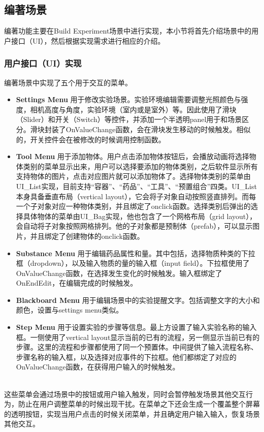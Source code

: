 \subsection{编著场景}
编著功能主要在Build Experiment场景中进行实现，本小节将首先介绍场景中的用户接口（UI），然后根据实现需求进行相应的介绍。

\subsubsection{用户接口（UI）实现}
编著场景中实现了五个用于交互的菜单。

\begin{itemize}
    \item \textbf{Settings Menu}
用于修改实验场景。实验环境编辑需要调整光照颜色与强度，相机高度与角度，实验环境（室内或是室外）等。因此使用了滑块（Slider）和开关（Switch）等控件，并添加一个半透明panel用于和场景区分。滑块封装了OnValueChange函数，会在滑块发生移动的时候触发。相似的，开关控件会在被修改的时候调用控制函数。
    
    \item \textbf{Tool Menu}
用于添加物体。用户点击添加物体按钮后，会播放动画将选择物体类别的菜单显示出来，用户可以选择要添加的物体类别，之后软件显示所有支持物体的图片，点击对应图片就可以添加物体了。选择物体类别的菜单由UI\_List实现，目前支持“容器”、“药品”、“工具”、“预置组合”四类。UI\_List本身具备垂直布局（vertical layout），它会将子对象自动按照竖直排列。而每一个子对象对应一种物体类别，并且绑定了onclick函数。选择类别后弹出的选择具体物体的菜单由UI\_Bag实现，他也包含了一个网格布局（grid layout），会自动将子对象按照网格排列。他的子对象都是预制体（prefab），可以显示图片，并且绑定了创建物体的onclick函数。
    
    \item \textbf{Substance Menu}
用于编辑药品属性和量。其中包括，选择物质种类的下拉框（dropdown），以及输入物质的量的输入框（input field）。下拉框使用了OnValueChange函数，在选择发生变化的时候触发。输入框绑定了OnEndEdit，在编辑完成的时候触发。

    \item \textbf{Blackboard Menu}
用于编辑场景中的实验提醒文字。包括调整文字的大小和颜色，设置与settings menu类似。
    
    \item \textbf{Step Menu}
用于设置实验的步骤等信息。最上方设置了输入实验名称的输入框。一侧使用了vertical layout显示当前的已有的流程，另一侧显示当前已有的步骤。这里的流程和步骤都使用了同一个预置体。中间提供了输入流程名称、步骤名称的输入框，以及选择对应事件的下拉框。他们都绑定了对应的OnValueChange函数，在获得用户输入的时候触发。
\end{itemize}
~\\
\indent    	这些菜单会通过场景中的按钮或用户输入触发，同时会暂停触发场景其他交互行为，防止在用户调整菜单的时候出现干扰。在菜单之下还会生成一个覆盖整个屏幕的透明按钮，实现当用户点击的时候关闭菜单，并且确定用户输入输入，恢复场景其他交互。


